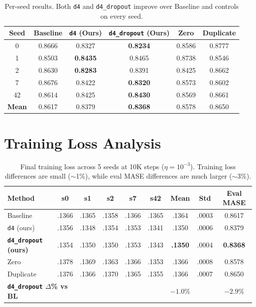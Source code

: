 \documentclass{article}
\begin{document}
\begin{table}[H]
\centering
\caption{Per-seed results. Both \texttt{d4} and \texttt{d4\_dropout} improve over Baseline and controls on every seed.}
\small
\begin{tabular}{cccccc}
\toprule
\textbf{Seed} & \textbf{Baseline} & \textbf{\texttt{d4} (Ours)} & \textbf{\texttt{d4\_dropout} (Ours)} & \textbf{Zero} & \textbf{Duplicate} \\
\midrule
0 & 0.8666 & 0.8327 & \textbf{0.8234} & 0.8586 & 0.8777 \\
1 & 0.8503 & \textbf{0.8435} & 0.8465 & 0.8738 & 0.8546 \\
2 & 0.8630 & \textbf{0.8283} & 0.8391 & 0.8425 & 0.8662 \\
7 & 0.8676 & 0.8422 & \textbf{0.8320} & 0.8573 & 0.8602 \\
42 & 0.8614 & 0.8425 & \textbf{0.8430} & 0.8569 & 0.8661 \\
\midrule
\textbf{Mean} & 0.8617 & 0.8379 & \textbf{0.8368} & 0.8578 & 0.8650 \\
\bottomrule
\end{tabular}
\end{table}

\section{Training Loss Analysis}
\label{app:trainloss}

\begin{table}[H]
\centering
\caption{Final training loss across 5 seeds at 10K steps ($\eta = 10^{-3}$). Training loss differences are small ($\sim$1\%), while eval MASE differences are much larger ($\sim$3\%).}
\small
\begin{tabular}{lcccccccc}
\toprule
\textbf{Method} & \textbf{s0} & \textbf{s1} & \textbf{s2} & \textbf{s7} & \textbf{s42} & \textbf{Mean} & \textbf{Std} & \textbf{Eval MASE} \\
\midrule
Baseline & .1366 & .1365 & .1358 & .1366 & .1365 & .1364 & .0003 & 0.8617 \\
\texttt{d4} (ours) & .1356 & .1348 & .1354 & .1353 & .1341 & .1350 & .0006 & 0.8379 \\
\textbf{\texttt{d4\_dropout} (ours)} & .1354 & .1350 & .1350 & .1353 & .1343 & \textbf{.1350} & .0004 & \textbf{0.8368} \\
Zero & .1378 & .1369 & .1363 & .1366 & .1353 & .1366 & .0008 & 0.8578 \\
Duplicate & .1376 & .1366 & .1370 & .1365 & .1355 & .1366 & .0007 & 0.8650 \\
\midrule
\multicolumn{2}{l}{\textbf{\texttt{d4\_dropout} $\Delta$\% vs BL}} & & & & & $-1.0\%$ & & $-2.9\%$ \\
\bottomrule
\end{tabular}
\end{table}
\end{document}
